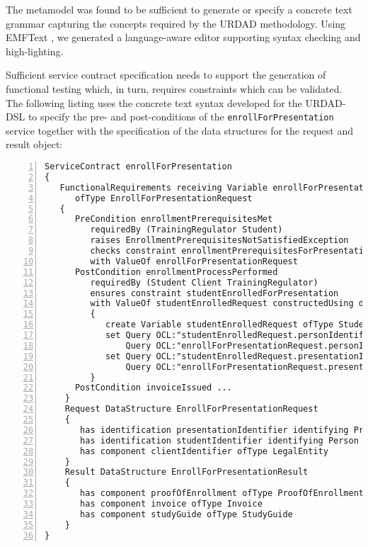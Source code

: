 The metamodel was found to be sufficient to generate or specify a concrete text grammar capturing the concepts required by the URDAD methodology. Using EMFText \cite{heidenreich_derivation_2009}, we generated a language-aware editor supporting syntax checking and high-lighting.

Sufficient service contract specification needs to support the generation of functional testing which, in turn, requires constraints which can be validated. The following listing uses the concrete text syntax developed for the URDAD-DSL to specify the pre- and post-conditions of the \verb+enrollForPresentation+ service together with the specification of the data structures for the request and result object:
\tiny \begin{lstlisting}[numbers=left,escapechar=|]
ServiceContract enrollForPresentation
{
   FunctionalRequirements receiving Variable enrollForPresentationRequest 
      ofType EnrollForPresentationRequest
   {
      PreCondition enrollmentPrerequisitesMet
         requiredBy (TrainingRegulator Student) 
         raises EnrollmentPrerequisitesNotSatisfiedException
         checks constraint enrollmentPrerequisitesForPresentationMet
         with ValueOf enrollForPresentationRequest
      PostCondition enrollmentProcessPerformed
         requiredBy (Student Client TrainingRegulator)
         ensures constraint studentEnrolledForPresentation 
         with ValueOf studentEnrolledRequest constructedUsing doSequential
         {
            create Variable studentEnrolledRequest ofType StudentEnrolledRequest
            set Query OCL:"studentEnrolledRequest.personIdentifier" equalTo
                Query OCL:"enrollForPresentationRequest.personIdentifier"                            
            set Query OCL:"studentEnrolledRequest.presentationIdentifier" equalTo
                Query OCL:"enrollForPresentationRequest.presentationIdentifier"                            
         }  
      PostCondition invoiceIssued ...
    }            
    Request DataStructure EnrollForPresentationRequest 
    {
       has identification presentationIdentifier identifying Presentation
       has identification studentIdentifier identifying Person
       has component clientIdentifier ofType LegalEntity         
    }
    Result DataStructure EnrollForPresentationResult 
    {
       has component proofOfEnrollment ofType ProofOfEnrollment
       has component invoice ofType Invoice
       has component studyGuide ofType StudyGuide
    }
}
\end{lstlisting}\normalsize

